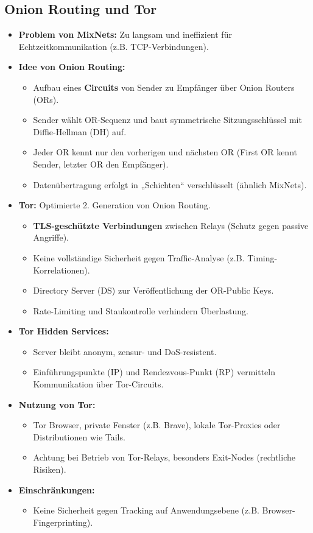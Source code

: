 \subsection{Onion Routing und Tor}
\begin{itemize}
    \item \textbf{Problem von MixNets:} Zu langsam und ineffizient für Echtzeitkommunikation (z.B. TCP-Verbindungen).
    \item \textbf{Idee von Onion Routing:} 
    \begin{itemize}
        \item Aufbau eines \textbf{Circuits} von Sender zu Empfänger über Onion Routers (ORs).
        \item Sender wählt OR-Sequenz und baut symmetrische Sitzungsschlüssel mit Diffie-Hellman (DH) auf.
        \item Jeder OR kennt nur den vorherigen und nächsten OR (First OR kennt Sender, letzter OR den Empfänger).
        \item Datenübertragung erfolgt in „Schichten“ verschlüsselt (ähnlich MixNets).
    \end{itemize}
    \item \textbf{Tor:} Optimierte 2. Generation von Onion Routing.
    \begin{itemize}
        \item \textbf{TLS-geschützte Verbindungen} zwischen Relays (Schutz gegen passive Angriffe).
        \item Keine vollständige Sicherheit gegen Traffic-Analyse (z.B. Timing-Korrelationen).
        \item Directory Server (DS) zur Veröffentlichung der OR-Public Keys.
        \item Rate-Limiting und Staukontrolle verhindern Überlastung.
    \end{itemize}
    \item \textbf{Tor Hidden Services:}
    \begin{itemize}
        \item Server bleibt anonym, zensur- und DoS-resistent.
        \item Einführungspunkte (IP) und Rendezvous-Punkt (RP) vermitteln Kommunikation über Tor-Circuits.
    \end{itemize}
    \item \textbf{Nutzung von Tor:}
    \begin{itemize}
        \item Tor Browser, private Fenster (z.B. Brave), lokale Tor-Proxies oder Distributionen wie Tails.
        \item Achtung bei Betrieb von Tor-Relays, besonders Exit-Nodes (rechtliche Risiken).
    \end{itemize}
    \item \textbf{Einschränkungen:}
    \begin{itemize}
        \item Keine Sicherheit gegen Tracking auf Anwendungsebene (z.B. Browser-Fingerprinting).
    \end{itemize}
\end{itemize}

